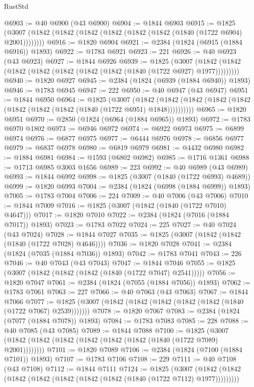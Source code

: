 \begin{lexlean}{RustStd}
\begin{coremodule}
@6903 := @40 @6900 (@43 @6900)
@6904 := @1844 @6903
@6915 := @1825 (@3007 (@1842 (@1842 (@1842 (@1842 (@1842 (@1842 (@1840 (@1722 @6904) @2001))))))))
@6916 := @1820 @6904
@6921 := @2384 (@1824 (@6915 (@1884 @6916)) @1893)
@6922 := @1783 @6921
@6923 := 221
@6926 := @40 @6923 (@43 @6923)
@6927 := @1844 @6926
@6939 := @1825
    (@3007 (@1842 (@1842 (@1842 (@1842 (@1842 (@1842 (@1842 (@1840 (@1722 @6927) @1977)))))))))
@6940 := @1820 @6927
@6945 := @2384 (@1824 (@6939 (@1884 @6940)) @1893)
@6946 := @1783 @6945
@6947 := 222
@6950 := @40 @6947 (@43 @6947)
@6951 := @1844 @6950
@6964 := @1825
    (@3007
      (@1842 (@1842 (@1842 (@1842 (@1842 (@1842 (@1842 (@1842 (@1840 (@1722 @6951) @1848))))))))))
@6965 := @1820 @6951
@6970 := @2850 (@1824 (@6964 (@1884 @6965)) @1893)
@6972 := @1783 @6970 @1802
@6973 := @6946 @6972
@6974 := @6922 @6973
@6975 := @6899 @6974
@6976 := @6877 @6975
@6977 := @6444 @6976
@6978 := @6856 @6977
@6979 := @6837 @6978
@6980 := @6819 @6979
@6981 := @4432 @6980
@6982 := @1884 @6981
@6984 := @1593 (@6802 @6982)
@6985 := @1716 @1361
@6988 := @1713 @6985 @3003 @1656
@6989 := 223
@6992 := @40 @6989 (@43 @6989)
@6993 := @1844 @6992
@6998 := @1825 (@3007 (@1840 (@1722 @6993) @4689))
@6999 := @1820 @6993
@7004 := @2384 (@1824 (@6998 (@1884 @6999)) @1893)
@7005 := @1783 @7004
@7006 := 224
@7009 := @40 @7006 (@43 @7006)
@7010 := @1844 @7009
@7016 := @1825 (@3007 (@1842 (@1840 (@1722 @7010) @4647)))
@7017 := @1820 @7010
@7022 := @2384 (@1824 (@7016 (@1884 @7017)) @1893)
@7023 := @1783 @7022
@7024 := 225
@7027 := @40 @7024 (@43 @7024)
@7028 := @1844 @7027
@7035 := @1825 (@3007 (@1842 (@1842 (@1840 (@1722 @7028) @4646))))
@7036 := @1820 @7028
@7041 := @2384 (@1824 (@7035 (@1884 @7036)) @1893)
@7042 := @1783 @7041
@7043 := 226
@7046 := @40 @7043 (@43 @7043)
@7047 := @1844 @7046
@7055 := @1825 (@3007 (@1842 (@1842 (@1842 (@1840 (@1722 @7047) @2541)))))
@7056 := @1820 @7047
@7061 := @2384 (@1824 (@7055 (@1884 @7056)) @1893)
@7062 := @1783 @7061
@7063 := 227
@7066 := @40 @7063 (@43 @7063)
@7067 := @1844 @7066
@7077 := @1825 (@3007 (@1842 (@1842 (@1842 (@1842 (@1842 (@1840 (@1722 @7067) @2539)))))))
@7078 := @1820 @7067
@7083 := @2384 (@1824 (@7077 (@1884 @7078)) @1893)
@7084 := @1783 @7083
@7085 := 228
@7088 := @40 @7085 (@43 @7085)
@7089 := @1844 @7088
@7100 := @1825 (@3007 (@1842 (@1842 (@1842 (@1842 (@1842 (@1842 (@1840 (@1722 @7089) @2001))))))))
@7101 := @1820 @7089
@7106 := @2384 (@1824 (@7100 (@1884 @7101)) @1893)
@7107 := @1783 @7106
@7108 := 229
@7111 := @40 @7108 (@43 @7108)
@7112 := @1844 @7111
@7124 := @1825
    (@3007 (@1842 (@1842 (@1842 (@1842 (@1842 (@1842 (@1842 (@1840 (@1722 @7112) @1977)))))))))

\end{coremodule}
\end{lexlean}
